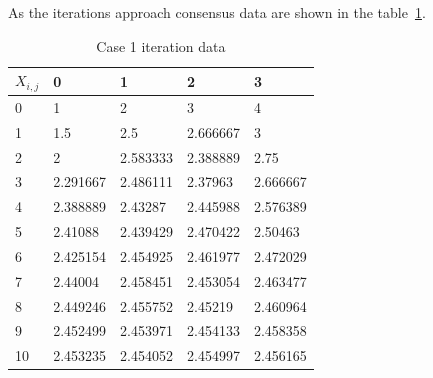 \documentclass[conference]{IEEEtran}
\begin{document}
As the iterations approach consensus data are shown in the table~\ref{tab:Result-1234}.


\begin{table}[htbp]
    \centering
    \caption{Case 1 iteration data}
    \begin{tabular}{lllll}
    \hline
    \hline
    $X_{i,j}$   & 0        & 1        & 2        & 3        \\ \hline
    0  & 1        & 2        & 3        & 4        \\ 
    1  & 1.5      & 2.5      & 2.666667 & 3        \\ 
    2  & 2        & 2.583333 & 2.388889 & 2.75     \\ 
    3  & 2.291667 & 2.486111 & 2.37963  & 2.666667 \\ 
    4  & 2.388889 & 2.43287  & 2.445988 & 2.576389 \\ 
    5  & 2.41088  & 2.439429 & 2.470422 & 2.50463  \\ 
    6  & 2.425154 & 2.454925 & 2.461977 & 2.472029 \\ 
    7  & 2.44004  & 2.458451 & 2.453054 & 2.463477 \\ 
    8  & 2.449246 & 2.455752 & 2.45219  & 2.460964 \\ 
    9  & 2.452499 & 2.453971 & 2.454133 & 2.458358 \\ 
    10 & 2.453235 & 2.454052 & 2.454997 & 2.456165 \\ 
    \hline
    \hline
    \end{tabular}
    \label{tab:Result-1234}
\end{table}
\end{document}

